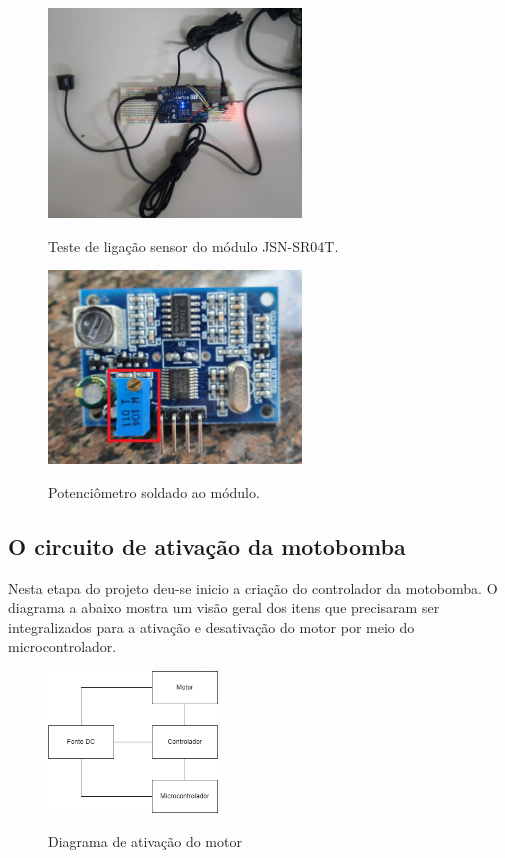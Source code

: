  \begin{figure}[H]
	\centering
	\caption{Teste de ligação sensor do módulo JSN-SR04T.}
	\includegraphics[width=0.6\textwidth]{figuras/teste_ultrassonico.jpg}
	\label{fig:sensor_ultrassonico}
\end{figure}

 \begin{figure}[H]
	\centering
	\caption{Potenciômetro soldado ao módulo.}
	\includegraphics[width=0.6\textwidth]{figuras/ultrassonico_res.jpg}
	\label{fig:ultrasonico_res}
\end{figure}

\subsection{O circuito de ativação da motobomba}

Nesta etapa do projeto deu-se inicio a criação do controlador da motobomba. O diagrama a abaixo mostra um visão geral dos itens que precisaram ser integralizados para a ativação e desativação do motor por meio do microcontrolador.

 \begin{figure}[H]
	\centering
	\caption{Diagrama de ativação do motor}
	\includegraphics[width=0.4\textwidth]{figuras/ativacao_motor.png}
	\label{fig:diagrama_ativacao_motor}
\end{figure}


